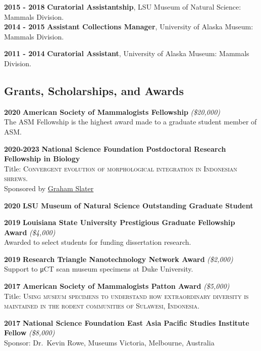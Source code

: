 \documentclass[
]{article}
\begin{document}
\textbf{2015 - 2018} \textbar{} \textbf{Curatorial Assistantship}, LSU
Museum of Natural Science: Mammals Division.\\

\textbf{2014 - 2015} \textbar{} \textbf{Assistant Collections Manager},
University of Alaska Museum: Mammals Division.

\textbf{2011 - 2014} \textbar{} \textbf{Curatorial Assistant},
University of Alaska Museum: Mammals Division.

\hypertarget{grants-scholarships-and-awards}{%
\subsection{Grants, Scholarships, and
Awards}\label{grants-scholarships-and-awards}}

\textbf{2020} \textbar{} \textbf{American Society of Mammalogists
Fellowship} \emph{(\$20,000)}\\
The ASM Fellowship is the highest award made to a graduate student
member of ASM.

\textbf{2020-2023} \textbar{} \textbf{National Science Foundation
Postdoctoral Research Fellowship in Biology}\\
Title: \textsc{Convergent evolution of morphological integration in
Indonesian shrews. }\\
Sponsored by \href{https://fourdimensionalbiology.com/}{Graham Slater}

\textbf{2020} \textbar{} \textbf{LSU Museum of Natural Science
Outstanding Graduate Student}

\textbf{2019} \textbar{} \textbf{Louisiana State University Prestigious
Graduate Fellowship Award} \emph{(\$4,000)}\\
Awarded to select students for funding dissertation research.

\textbf{2019} \textbar{} \textbf{Research Triangle Nanotechnology
Network Award} \emph{(\$2,000)}\\
Support to μCT scan museum specimens at Duke University.

\textbf{2017} \textbar{} \textbf{American Society of Mammalogists Patton
Award} \emph{(\$5,000)}\\
Title: \textsc{Using museum specimens to understand how extraordinary
diversity is maintained in the rodent communities of Sulawesi,
Indonesia.}

\textbf{2017} \textbar{} \textbf{National Science Foundation East Asia
Pacific Studies Institute Fellow} \emph{(\$8,000)}\\
Sponsor: Dr.~Kevin Rowe, Museums Victoria, Melbourne, Australia
\end{document}

